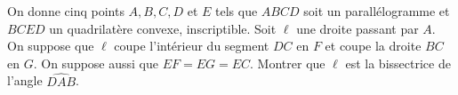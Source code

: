 On donne cinq points $A, B, C, D$ et $E$ tels que $ABCD$ soit un parallélogramme et $BCED$ un quadrilatère
convexe, inscriptible. Soit $\ell$ une droite passant par $A$. On suppose que $\ell$ coupe l'intérieur du
segment $DC$ en $F$ et coupe la droite $BC$ en $G$. On suppose aussi que $EF = EG = EC$. Montrer que $\ell$ est
la bissectrice de l'angle $\widehat{DAB}$.
